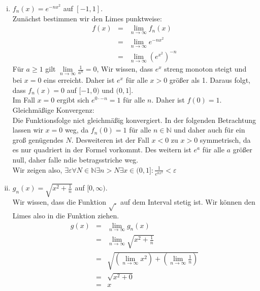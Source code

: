 \documentclass[11pt,a4paper,ngerman]{article}
\newcommand{\limes}[2][n]{\underset{ #1 \rightarrow #2}{\lim}}
\begin{document}
\begin{enumerate}[(i)]
    \item $f_n(x) = e^{-nx^2}$ auf $[-1,1]$.\\ 
        Zunächst bestimmen wir den Limes punktweise:\\
        $$\begin{array}{rcl}
            f(x) &=& \limes{\infty} f_n(x)\\
                &=& \limes{\infty} e^{-nx^2}\\
                &=& \limes{\infty} \left( e^{x^2}\right)^{-n}
        \end{array}$$
        Für $a \geq 1$ gilt $\limes{\infty}\frac{1}{a^n} = 0$,
        Wir wissen, dass $e^x$ streng monoton steigt und bei $x=0$ eins
        erreicht. Daher ist $e^x$ für alle $x>0$ größer als 1.
        Daraus folgt, dass $f_n(x) = 0$ auf $[-1,0)$ und $(0,1]$.\\
        Im Fall $x=0$ ergibt sich $e^{0 \cdot -n} = 1$ für alle $n$.
        Daher ist $f(0) = 1$.\\

        Gleichmäßige Konvergenz:\\
        Die Funktionsfolge nict gleichmäßig konvergiert. In der folgenden
        Betrachtung lassen wir $x=0$ weg, da $f_n(0) = 1$ für alle $n\in\mathbb{N}$
        und daher auch für ein groß genügendes $N$. Desweiteren ist der Fall
        $x<0$ zu $x>0$ symmetrisch, da es nur quadriert in der Formel vorkommt. Des
        weitern ist $e^a$ für alle $a$ größer null, daher falle ndie betragsstriche weg.\\
        Wir zeigen also, 
        $\exists \varepsilon \forall N \in \mathbb{N} \exists n > N \exists x\in(0,1] : 
        \frac{1}{e^{nx^2}} < \varepsilon$

    \item $g_n(x) = \sqrt{x^2 + \frac{1}{n}}$ auf $[0,\infty).$\\
        Wir wissen, dass die Funktion $\sqrt{.}$ auf dem Interval stetig ist.
        Wir können den Limes also in die Funktion ziehen.\\
        $$\begin{array}{rcl}
            g(x) &=& \limes{\infty} g_n(x)\\
                &=& \limes{\infty} \sqrt{x^2 + \frac{1}{n}}\\
                &=& \sqrt{(\limes{\infty} x^2) + (\limes{\infty} \frac{1}{n})}\\
                &=& \sqrt{x^2 + 0}\\
                &=& x
        \end{array}$$


\end{enumerate}
\end{document}
